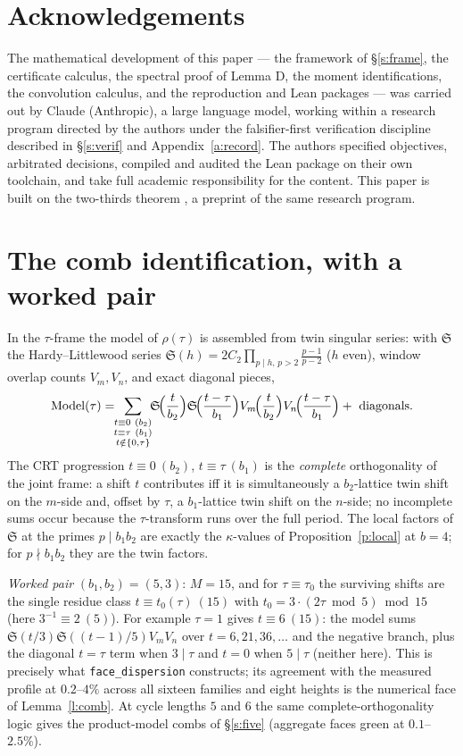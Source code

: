 \documentclass[11pt]{article}
\numberwithin{equation}{section}
\theoremstyle{definition}
\theoremstyle{remark}
\newcommand{\SSS}{\mathfrak{S}}
\begin{document}
\section*{Acknowledgements}

The mathematical development of this paper --- the framework of
\S\ref{s:frame}, the certificate calculus, the spectral proof of
Lemma D, the moment identifications, the convolution calculus,
and the reproduction and Lean packages --- was carried out by
Claude (Anthropic), a large language model, working within a
research program directed by the authors under the
falsifier-first verification discipline described in
\S\ref{s:verif} and Appendix~\ref{a:record}. The authors
specified objectives, arbitrated decisions, compiled and audited
the Lean package on their own toolchain, and take full academic
responsibility for the content. This paper is built on the
two-thirds theorem \cite{C26}, a preprint of the same research
program.

\appendix

\section{The comb identification, with a worked
pair}\label{a:comb}

In the $\tau$-frame the model of $\rho(\tau)$ is assembled from
twin singular series: with $\SSS$ the Hardy--Littlewood series
$\SSS(h)=2C_2\prod_{p\mid h,\,p>2}\frac{p-1}{p-2}$ ($h$ even),
window overlap counts $V_m,V_n$, and exact diagonal pieces,
\[
\mathrm{Model}(\tau)=\!\!\sum_{\substack{t\equiv0\ (b_2)\\
t\equiv\tau\ (b_1)\\ t\notin\{0,\tau\}}}\!\!
\SSS\!\Bigl(\frac{t}{b_2}\Bigr)\SSS\!\Bigl(\frac{t-\tau}{b_1}\Bigr)
V_m\!\Bigl(\frac{t}{b_2}\Bigr)V_n\!\Bigl(\frac{t-\tau}{b_1}\Bigr)
+\ \text{diagonals}.
\]
The CRT progression $t\equiv0\ (b_2)$, $t\equiv\tau\ (b_1)$ is
the \emph{complete} orthogonality of the joint frame: a shift $t$
contributes iff it is simultaneously a $b_2$-lattice twin shift
on the $m$-side and, offset by $\tau$, a $b_1$-lattice twin shift
on the $n$-side; no incomplete sums occur because the
$\tau$-transform runs over the full period. The local factors of
$\SSS$ at the primes $p\mid b_1b_2$ are exactly the
$\kappa$-values of Proposition~\ref{p:local} at $b=4$; for
$p\nmid b_1b_2$ they are the twin factors.

\emph{Worked pair} $(b_1,b_2)=(5,3)$: $M=15$, and for
$\tau\equiv\tau_0$ the surviving shifts are the single residue
class $t\equiv t_0(\tau)\ (15)$ with
$t_0=3\cdot(2\tau\bmod5)\bmod15$ (here $3^{-1}\equiv2\ (5)$). For
example $\tau=1$ gives $t\equiv6\ (15)$: the model sums
$\SSS(t/3)\SSS((t-1)/5)V_mV_n$ over $t=6,21,36,\dots$ and the
negative branch, plus the diagonal $t=\tau$ term when $3\mid\tau$
and $t=0$ when $5\mid\tau$ (neither here). This is precisely what
\texttt{face\_dispersion} constructs; its agreement with the
measured profile at $0.2$--$4\%$ across all sixteen families and
eight heights is the numerical face of Lemma~\ref{l:comb}. At
cycle lengths $5$ and $6$ the same complete-orthogonality logic
gives the product-model combs of \S\ref{s:five} (aggregate faces
green at $0.1$--$2.5\%$).
\end{document}
